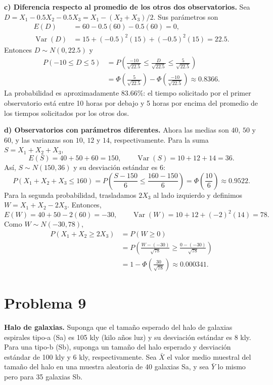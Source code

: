 \documentclass[a4paper]{article}
\begin{document}
\textbf{c) Diferencia respecto al promedio de los otros dos observatorios.}
Sea $D=X_1-0.5X_2-0.5X_3=X_1-(X_2+X_3)/2$. Sus parámetros son
\begin{align*}
E(D)&=60-0.5(60)-0.5(60)=0,\\
\operatorname{Var}(D)&=15+(-0.5)^2(15)+(-0.5)^2(15)=22.5.
\end{align*}
Entonces $D\sim N(0,22.5)$ y
\begin{align*}
P(-10\le D\le 5)
&=P\left(\frac{-10}{\sqrt{22.5}}\le\frac{D}{\sqrt{22.5}}\le\frac{5}{\sqrt{22.5}}\right)\\
&=\Phi\left(\frac{5}{\sqrt{22.5}}\right)-\Phi\left(\frac{-10}{\sqrt{22.5}}\right)
\approx\boxed{0.8366}.
\end{align*}
La probabilidad es aproximadamente $83.66\%$: el tiempo solicitado por el primer observatorio está entre 10 horas por debajo y 5 horas por encima del promedio de los tiempos solicitados por los otros dos.

\textbf{d) Observatorios con parámetros diferentes.}
Ahora las medias son $40$, $50$ y $60$, y las varianzas son $10$, $12$ y $14$, respectivamente. Para la suma $S=X_1+X_2+X_3$,
\[
E(S)=40+50+60=150,\qquad
\operatorname{Var}(S)=10+12+14=36.
\]
Así, $S\sim N(150,36)$ y su desviación estándar es $6$:
\[
P(X_1+X_2+X_3\le 160)
=P\left(\frac{S-150}{6}\le\frac{160-150}{6}\right)
=\Phi\left(\frac{10}{6}\right)
\approx\boxed{0.9522}.
\]
Para la segunda probabilidad, trasladamos $2X_3$ al lado izquierdo y definimos $W=X_1+X_2-2X_3$. Entonces,
\[
E(W)=40+50-2(60)=-30,\qquad
\operatorname{Var}(W)=10+12+(-2)^2(14)=78.
\]
Como $W\sim N(-30,78)$,
\begin{align*}
P(X_1+X_2\ge 2X_3)
&=P(W\ge 0)\\
&=P\left(\frac{W-(-30)}{\sqrt{78}}\ge\frac{0-(-30)}{\sqrt{78}}\right)\\
&=1-\Phi\left(\frac{30}{\sqrt{78}}\right)
\approx\boxed{0.000341}.
\end{align*}

\section{Problema 9}
\textbf{Halo de galaxias.} Suponga que el tamaño esperado del halo de galaxias espirales tipo-a (Sa) es 105 kly (kilo años luz) y su desviación estándar es 8 kly. Para una tipo-b (Sb), suponga un tamaño del halo esperado y desviación estándar de 100 kly y 6 kly, respectivamente. Sea $\bar{X}$ el valor medio muestral del tamaño del halo en una muestra aleatoria de 40 galaxias Sa, y sea $\bar{Y}$ lo mismo pero para 35 galaxias Sb.
\end{document}
